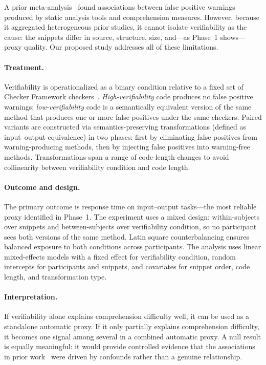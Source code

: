 \documentclass[sigplan,10pt,anonymous=false]{acmart}
\begin{document}
A prior meta-analysis~\cite{FeldmanKC2023} found associations between
false positive warnings produced by static analysis tools and comprehension measures.
However, because it aggregated heterogeneous prior studies, it cannot isolate
verifiability as the cause: the snippets differ in source, structure, size,
and---as Phase~1 shows---proxy quality.
Our proposed study addresses all of these limitations.

\paragraph{Treatment.}
Verifiability is operationalized as a binary condition relative to a fixed
set of Checker Framework checkers~\cite{PapiACPE2008}.
\emph{High-verifiability} code produces no false positive warnings;
\emph{low-verifiability} code is a semantically equivalent version of the
same method that produces one or more false positives under the same
checkers.
Paired variants are constructed via semantics-preserving transformations
(defined as input--output equivalence) in two phases: first by eliminating
false positives from warning-producing methods, then by injecting false
positives into warning-free methods.
Transformations span a range of code-length changes to avoid collinearity
between verifiability condition and code length.

\paragraph{Outcome and design.}
The primary outcome is response time on input--output tasks---the most
reliable proxy identified in Phase~1.
The experiment uses a mixed design: within-subjects over snippets and
between-subjects over verifiability condition, so no participant sees both
versions of the same method.
Latin square counterbalancing ensures balanced exposure to both conditions
across participants.
The analysis uses linear mixed-effects models with a fixed effect for
verifiability condition, random intercepts for participants and snippets,
and covariates for snippet order, code length, and transformation type.

\paragraph{Interpretation.}
If verifiability alone explains comprehension difficulty well, it can be used
as a standalone automatic proxy.
If it only partially explains comprehension difficulty, it becomes one signal
among several in a combined automatic proxy.
A null result is equally meaningful: it would provide controlled evidence
that the associations in prior work~\cite{FeldmanKC2023} were driven by
confounds rather than a genuine relationship.
\end{document}
